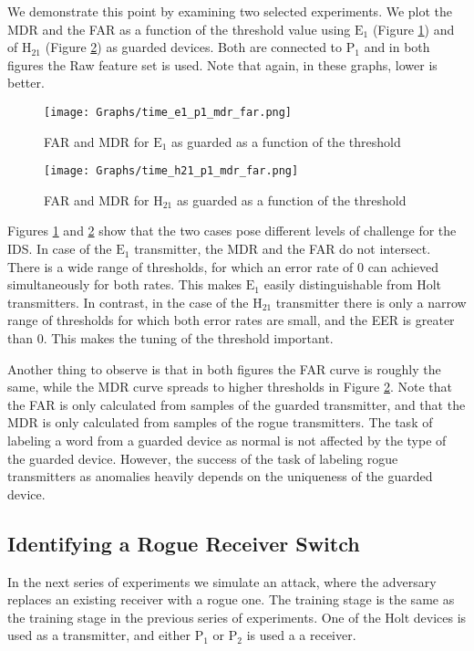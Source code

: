 \documentclass[conference]{IEEEtran}
\begin{document}
  We demonstrate this point by examining two selected experiments. We plot the MDR and the FAR as a function of the threshold value using \(\text{E}_1\) (Figure \ref{fig:detection_easy_example}) and of \(\text{H}_{21}\) (Figure \ref{fig:detection_difficult_example}) as guarded devices. Both are connected to \(\text{P}_1\) and in both figures the Raw feature set is used. Note that again, in these graphs, lower is better.
  
  \begin{figure}[t]
    \centering
    \texttt{[image: Graphs/time\_e1\_p1\_mdr\_far.png]}
    \caption{FAR and MDR for \(\text{E}_1\) as guarded as a function of the threshold}
    \label{fig:detection_easy_example}
  \end{figure}
  
  \begin{figure}[t]
    \centering
    \texttt{[image: Graphs/time\_h21\_p1\_mdr\_far.png]}
    \caption{FAR and MDR for \(\text{H}_{21}\) as guarded as a function of the threshold}
    \label{fig:detection_difficult_example}
  \end{figure}
  
  Figures \ref{fig:detection_easy_example} and \ref{fig:detection_difficult_example} show that the two cases pose different levels of challenge for the IDS.
  In case of the \(\text{E}_1\) transmitter, the MDR and the FAR do not intersect. There is a wide range of thresholds, for which an error rate of 0 can achieved simultaneously for both rates. This makes \(\text{E}_1\) easily distinguishable from Holt transmitters. In contrast, in the case of the \(\text{H}_{21}\) transmitter there is only a narrow range of thresholds for which both error rates are small, and the EER is greater than 0. This makes the tuning of the threshold important.
  
  Another thing to observe is that in both figures the FAR curve is roughly the same, while the MDR curve spreads to higher thresholds in Figure \ref{fig:detection_difficult_example}. Note that the FAR is only calculated from samples of the guarded transmitter, and that the MDR is only calculated from samples of the rogue transmitters. The task of labeling a word from a guarded device as normal is not affected by the type of the guarded device. However, the success of the task of labeling rogue transmitters as anomalies heavily depends on the uniqueness of the guarded device.
   
\subsection{Identifying a Rogue Receiver Switch}
  In the next series of experiments we simulate an attack, where the adversary replaces an existing receiver with a rogue one. The training stage is the same as the training stage in the previous series of experiments. One of the Holt devices is used as a transmitter, and either \(\text{P}_1\) or \(\text{P}_2\) is used a a receiver.
  
\end{document}
